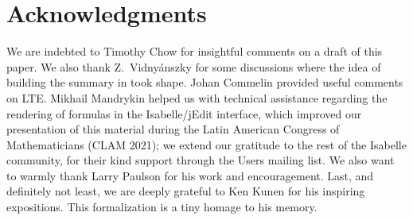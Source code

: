 \section*{Acknowledgments}
\label{sec:acknowledgments}
We are indebted to Timothy Chow for insightful comments on a draft of
this paper. We also thank Z.~Vidnyánszky for some discussions where the idea of
building the summary in  took shape.
Johan Commelin provided useful comments on LTE.
Mikhail Mandrykin helped us with technical assistance regarding the
rendering of formulas in the Isabelle/jEdit interface, which improved
our presentation of this material during the Latin American Congress
of Mathematicians (CLAM 2021); we extend our gratitude to the rest of
the Isabelle community, for their kind support through the Users mailing
list. We also want to warmly thank Larry Paulson for his work and
encouragement.  Last, and definitely not least, we are deeply grateful
to Ken Kunen for his
inspiring expositions. This formalization is a tiny homage to his
memory.


